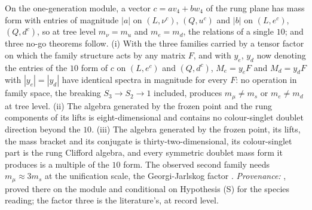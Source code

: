 On the one-generation module, a vector $c = a v_{4} + b w_{4}$ of the rung plane has mass form with entries of magnitude $|a|$ on $(L, \nu^{c})$, $(Q, u^{c})$ and $|b|$ on $(L, e^{c})$, $(Q, d^{c})$, so at tree level $m_{\nu} = m_{u}$ and $m_{e} = m_{d}$, the relations of a single $10$; and three no-go theorems follow. (i) With the three families carried by a tensor factor on which the family structure acts by any matrix $F$, and with $y_{e}$, $y_{d}$ now denoting the entries of the $10$ form of $c$ on $(L, e^{c})$ and $(Q, d^{c})$, $M_{e} = y_{e}F$ and $M_{d} = y_{d}F$ with $|y_{e}| = |y_{d}|$ have identical spectra in magnitude for every $F$: no operation in family space, the breaking $S_{3} \to S_{2} \to 1$ included, produces $m_{\mu} \neq m_{s}$ or $m_{e} \neq m_{d}$ at tree level. (ii) The algebra generated by the frozen point and the rung components of its lifts is eight-dimensional and contains no colour-singlet doublet direction beyond the $10$. (iii) The algebra generated by the frozen point, its lifts, the mass bracket and its conjugate is thirty-two-dimensional, its colour-singlet part is the rung Clifford algebra, and every symmetric doublet mass form it produces is a multiple of the $10$ form. The observed second family needs $m_{\mu} \approx 3 m_{s}$ at the unification scale, the Georgi-Jarlskog factor \cite{GeorgiJarlskog1979}. \emph{Provenance:} \cite[Cor.~9.25, Thms.~9.31, 9.33, 9.35]{ButlerT12}, proved there on the module and conditional on Hypothesis (S) for the species reading; the factor three is the literature's, at record level.
